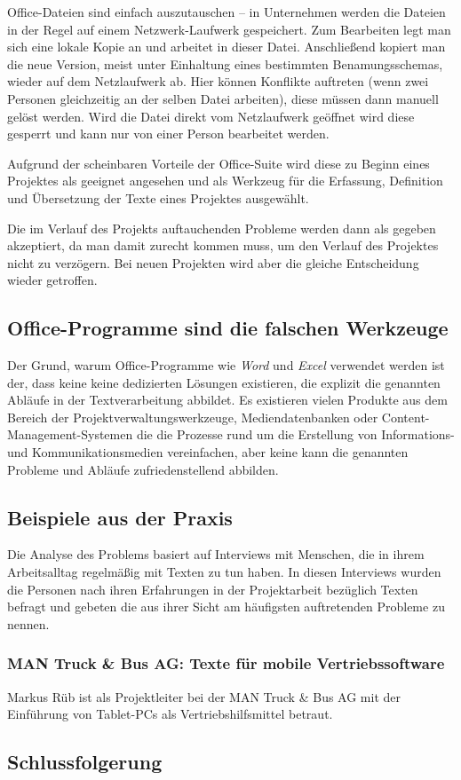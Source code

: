 Office-Dateien sind einfach auszutauschen – in Unternehmen werden die Dateien in der Regel auf einem Netzwerk-Laufwerk gespeichert. Zum Bearbeiten legt man sich eine lokale Kopie an und arbeitet in dieser Datei. Anschließend kopiert man die neue Version, meist unter Einhaltung eines bestimmten Benamungsschemas, wieder auf dem Netzlaufwerk ab. Hier können Konflikte auftreten (wenn zwei Personen gleichzeitig an der selben Datei arbeiten), diese müssen dann manuell gelöst werden. Wird die Datei direkt vom Netzlaufwerk geöffnet wird diese gesperrt und kann nur von einer Person bearbeitet werden.

Aufgrund der scheinbaren Vorteile der Office-Suite wird diese zu Beginn eines Projektes als geeignet angesehen und als Werkzeug für die Erfassung, Definition und Übersetzung der Texte eines Projektes ausgewählt.

Die im Verlauf des Projekts auftauchenden Probleme werden dann als gegeben akzeptiert, da man  damit zurecht kommen muss, um den Verlauf des Projektes nicht zu verzögern. Bei neuen Projekten wird aber die gleiche Entscheidung wieder getroffen.

\subsection{Office-Programme sind die falschen Werkzeuge}

Der Grund, warum Office-Programme wie \emph{Word} und \emph{Excel} verwendet werden ist der, dass keine keine dedizierten Lösungen existieren, die explizit die genannten Abläufe in der Textverarbeitung abbildet. Es existieren vielen Produkte aus dem Bereich der Projektverwaltungswerkzeuge, Mediendatenbanken oder Content-Management-Systemen die die Prozesse rund um die Erstellung von Informations- und Kommunikationsmedien vereinfachen, aber keine kann die genannten Probleme und Abläufe zufriedenstellend abbilden.

\subsection{Beispiele aus der Praxis}

Die Analyse des Problems basiert auf Interviews mit Menschen, die in ihrem Arbeitsalltag regelmäßig mit Texten zu tun haben. In diesen Interviews wurden die Personen nach ihren Erfahrungen in der Projektarbeit bezüglich Texten befragt und gebeten die aus ihrer Sicht am häufigsten auftretenden Probleme zu nennen.

\subsubsection{MAN Truck \& Bus AG: Texte für mobile Vertriebssoftware}

Markus Rüb ist als Projektleiter bei der MAN Truck \& Bus AG mit der Einführung von Tablet-PCs als Vertriebshilfsmittel betraut.

\subsection{Schlussfolgerung}

